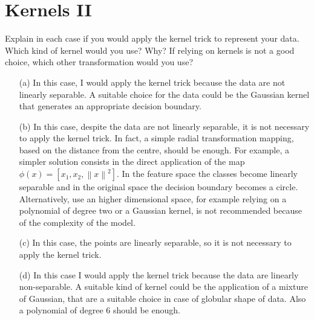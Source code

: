 \section{Kernels II}

Explain in each case if you would apply the kernel trick to represent your 
data. Which kind of kernel would you use? Why? If relying on kernels is not 
a good choice, which other transformation would you use?
\begin{itemize}
	\item[(a)] In this case, I would apply the kernel trick because the data 
	are not	linearly separable.
	A suitable choice for the data could be the Gaussian kernel that generates  
	an appropriate decision boundary.
	
	\item[(b)] In this case, despite the data are not linearly separable, it is 
	not necessary to apply the kernel trick. In fact, a simple radial 
	transformation mapping, based on the distance from the centre, should be 
	enough. 
	For example, a simpler solution consists in the direct application of the 
	map $\phi(x)=[x_1, x_2, {\left\| x\right\|}^{2}]$. In the feature space the 
	classes become linearly separable and in the original space the decision 
	boundary becomes a circle.
	Alternatively, use an higher dimensional space, for example relying 
	on a polynomial of degree two or a Gaussian kernel, is not recommended 
	because of the complexity of the model.

	\item[(c)] In this case, the points are linearly separable, so it is not 
	necessary to apply the kernel trick.  
	
	\item[(d)] In this case I would apply the kernel trick because the data 
	are linearly non-separable. A suitable kind of kernel could be the 
	application of a mixture of Gaussian, that are a suitable choice in case of 
	globular shape of data. Also a polynomial of degree $6$ should be 
	enough.
	
\end{itemize}
